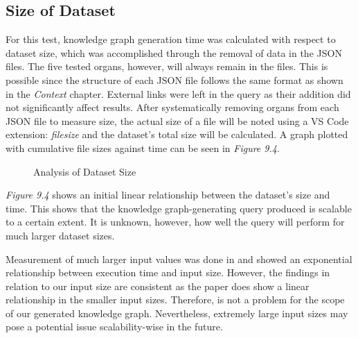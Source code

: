 \subsection{Size of Dataset}
\hspace{0.5cm} For this test, knowledge graph generation time was calculated with respect to dataset size, which was accomplished through the removal of data in the JSON files. The five tested organs, however, will always remain in the files. This is possible since the structure of each JSON file follows the same format as shown in the \textit{Context} chapter. External links were left in the query as their addition did not significantly affect results. After systematically removing organs from each JSON file to measure size, the actual size of a file will be noted using a VS Code extension: \textit{filesize} and the dataset's total size will be calculated. A graph plotted with cumulative file sizes against time can be seen in \textit{Figure 9.4}.

\begin{figure}[H]
\begin{center}
\end{center}
\vspace{-0.75cm}
\caption{Analysis of Dataset Size}
\end{figure}

\textit{Figure 9.4} shows an initial linear relationship between the dataset's size and time. This shows that the knowledge graph-generating query produced is scalable to a certain extent. It is unknown, however, how well the query will perform for much larger dataset sizes. 

Measurement of much larger input values was done in \cite{sparqlanything} and showed an exponential relationship between execution time and input size. However, the findings in relation to our input size are consistent as the paper does show a linear relationship in the smaller input sizes. Therefore, is not a problem for the scope of our generated knowledge graph. Nevertheless, extremely large input sizes may pose a potential issue scalability-wise in the future.

